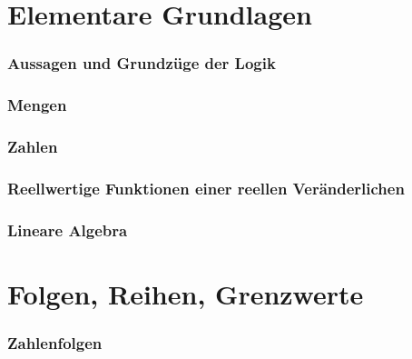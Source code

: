 





\maketitle
\newpage
\tableofcontents
\newpage


\part{Elementare Grundlagen}

\section{Aussagen und Grundzüge der Logik}
%

\section{Mengen}\label{sec:Mengen}
%

\section{Zahlen}
%

\section{Reellwertige Funktionen einer reellen Veränderlichen}
%

\section{Lineare Algebra}
%
\newpage
\part{Folgen, Reihen, Grenzwerte}
\setcounter{section}{0}
\section{Zahlenfolgen}
